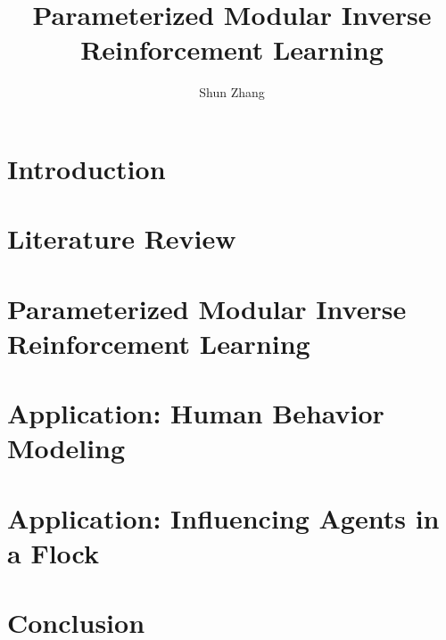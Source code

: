 \documentclass[10pt]{book}
\title{Parameterized Modular Inverse Reinforcement Learning}
\author{Shun Zhang}
\date{}
\begin{document}
\maketitle

\chapter{Introduction}

\chapter{Literature Review}


\chapter{Parameterized Modular Inverse Reinforcement Learning}


\chapter{Application: Human Behavior Modeling}




\chapter{Application: Influencing Agents in a Flock}


\chapter{Conclusion}



\end{document}
